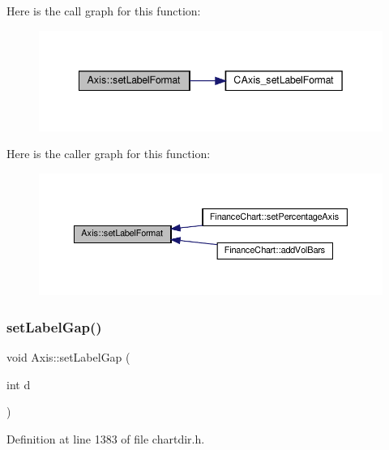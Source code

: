 Here is the call graph for this function\+:
\nopagebreak
\begin{figure}[H]
\begin{center}
\leavevmode
\includegraphics[width=342pt]{class_axis_a99c109ddb7e61206f7a8f1883d3e7a85_cgraph}
\end{center}
\end{figure}
Here is the caller graph for this function\+:
\nopagebreak
\begin{figure}[H]
\begin{center}
\leavevmode
\includegraphics[width=350pt]{class_axis_a99c109ddb7e61206f7a8f1883d3e7a85_icgraph}
\end{center}
\end{figure}
\mbox{\label{class_axis_ae4b909cc52ff784757e92917a18ad917}} 
\subsubsection{\texorpdfstring{set\+Label\+Gap()}{setLabelGap()}}
{\footnotesize\ttfamily void Axis\+::set\+Label\+Gap (\begin{DoxyParamCaption}\item[{int}]{d }\end{DoxyParamCaption})\hspace{0.3cm}{\ttfamily [inline]}}



Definition at line 1383 of file chartdir.\+h.

